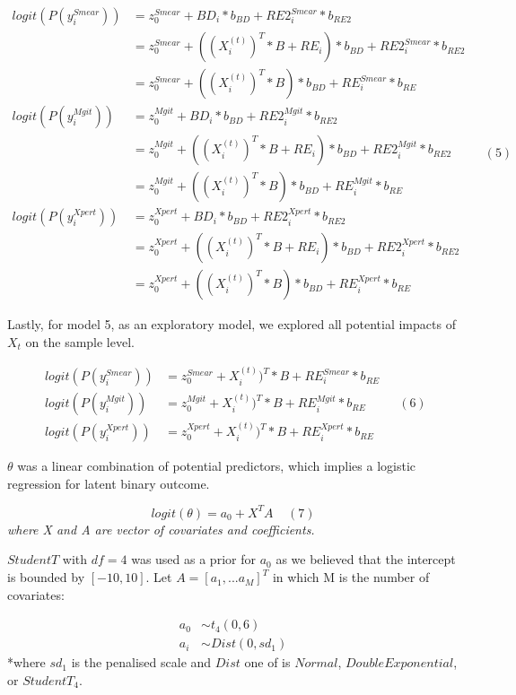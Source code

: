 \documentclass[
]{article}
\begin{document}
\[
\begin{aligned}
logit(P(y^{Smear}_i)) &= z^{Smear}_0 + BD_i * b_{BD} + RE2^{Smear}_i * b_{RE2}\\
&= z^{Smear}_0 + ((X^{(t)}_i)^T * B + RE_i) * b_{BD} + RE2^{Smear}_i * b_{RE2} \\
&= z^{Smear}_0 + ((X^{(t)}_i)^T * B) * b_{BD} + RE^{Smear}_i * b_{RE} \\
logit(P(y^{Mgit}_i)) &= z^{Mgit}_0 + BD_i * b_{BD} + RE2^{Mgit}_i * b_{RE2}\\
&= z^{Mgit}_0 + ((X^{(t)}_i)^T * B + RE_i) * b_{BD} + RE2^{Mgit}_i * b_{RE2} \\
&= z^{Mgit}_0 + ((X^{(t)}_i)^T * B) * b_{BD} + RE^{Mgit}_i * b_{RE} \\
logit(P(y^{Xpert}_i)) &= z^{Xpert}_0 + BD_i * b_{BD} + RE2^{Xpert}_i * b_{RE2}\\
&= z^{Xpert}_0 + ((X^{(t)}_i)^T * B + RE_i) * b_{BD} + RE2^{Xpert}_i * b_{RE2}\\
&= z^{Xpert}_0 + ((X^{(t)}_i)^T * B) * b_{BD} + RE^{Xpert}_i * b_{RE}
\end{aligned} 
\;\;\;\;(
5
)
\]

Lastly, for model 5, as an exploratory model, we explored all potential impacts of \(X_t\) on the sample level.

\[
\begin{aligned}
logit(P(y^{Smear}_i)) &= z^{Smear}_0 + X^{(t)}_i)^T * B + RE^{Smear}_i * b_{RE} \\
logit(P(y^{Mgit}_i)) &= z^{Mgit}_0 + X^{(t)}_i)^T * B + RE^{Mgit}_i * b_{RE} \\
logit(P(y^{Xpert}_i)) &= z^{Xpert}_0 + X^{(t)}_i)^T * B + RE^{Xpert}_i * b_{RE}
\end{aligned} 
\;\;\;\;(
6
)
\]

\(\theta\) was a linear combination of potential predictors, which implies a logistic regression for latent binary outcome.

\[
logit(\theta) = a_0 + X^T A
\;\;\;\;(
7
)
\]
\emph{where X and A are vector of covariates and coefficients.}

\(StudentT\) with \(df=4\) was used as a prior for \(a_0\) as we believed that the intercept is bounded by \([-10,10]\). Let \(A = [a_1,...a_M]^T\) in which M is the number of covariates:

\[
\begin{aligned}
a_0 &\sim t_4(0, 6)\\
a_i &\sim Dist(0, sd_1)
\end{aligned}
\]
*where \(sd_1\) is the penalised scale and \(Dist\) one of is \(Normal\), \(DoubleExponential\), or \(StudentT_4\).
\end{document}
